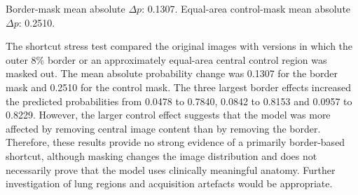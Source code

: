 \documentclass[10pt,a4paper]{article}
\begin{document}
Border-mask mean absolute $\Delta p$: 0.1307. Equal-area control-mask mean absolute $\Delta p$: 0.2510.

The shortcut stress test compared the original images with versions in which the outer 8\% border or an approximately equal-area central control region was masked out. The mean absolute probability change was 0.1307 for the border mask and 0.2510 for the control mask. The three largest border effects increased the predicted probabilities from 0.0478 to 0.7840, 0.0842 to 0.8153 and 0.0957 to 0.8229. However, the larger control effect suggests that the model was more affected by removing central image content than by removing the border. Therefore, these results provide no strong evidence of a primarily border-based shortcut, although masking changes the image distribution and does not necessarily prove that the model uses clinically meaningful anatomy. Further investigation of lung regions and acquisition artefacts would be appropriate.
\end{document}
